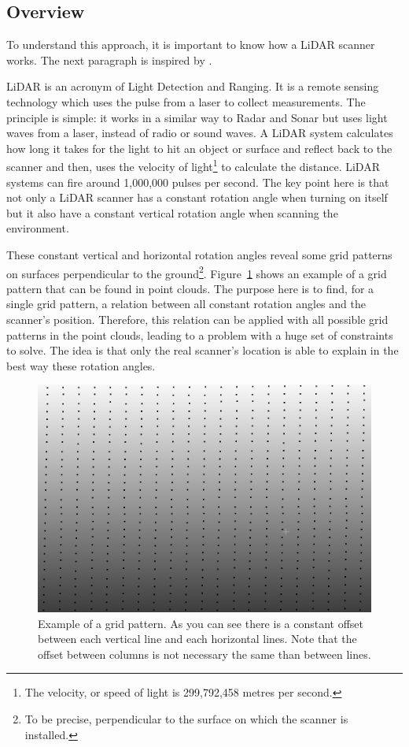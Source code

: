 \subsection{Overview}
To understand this approach, it is important to know how a LiDAR scanner works. The next paragraph is inspired by \cite{lidar}.

LiDAR is an acronym of Light Detection and Ranging. It is a remote sensing technology which uses the pulse from a laser to collect measurements. The principle is simple: it works in a similar way to Radar and Sonar but uses light waves from a laser, instead of radio or sound waves. A LiDAR system calculates how long it takes for the light to hit an object or surface and reflect back to the scanner and then, uses the velocity of light\footnote{The velocity, or speed of light is 299,792,458 metres per second.} to calculate the distance. LiDAR systems can fire around 1,000,000 pulses per second. The key point here is that not only a LiDAR scanner has a constant rotation angle when turning on itself but it also have a constant vertical rotation angle when scanning the environment.

These constant vertical and horizontal rotation angles reveal some grid patterns on surfaces perpendicular to the ground\footnote{To be precise, perpendicular to the surface on which the scanner is installed.}. Figure~\ref{fig:grid1} shows an example of a grid pattern that can be found in point clouds. The purpose here is to find, for a single grid pattern, a relation between all constant rotation angles and the scanner's position. Therefore, this relation can be applied with all possible grid patterns in the point clouds, leading to a problem with a huge set of
constraints to solve. The idea is that only the real scanner's location is able to explain in the best way these rotation angles.

\begin{figure}[H]
 \centering
 \includegraphics[scale=0.5]{img/grid1.png}
 \caption{Example of a grid pattern. As you can see there is a constant offset between each vertical line and each horizontal lines. Note that the offset between columns is not necessary the same than between lines.}
 \label{fig:grid1}
\end{figure}

